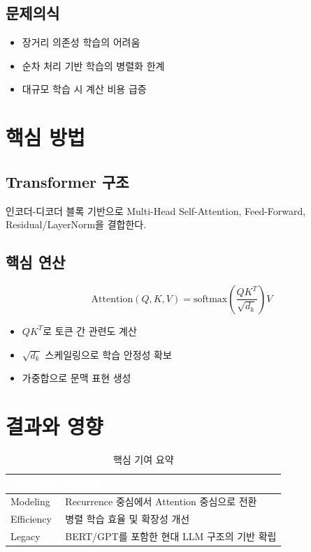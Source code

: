 \documentclass[11pt]{article}
\newenvironment{insightbox}[1]{%
  \begin{tcolorbox}[colback=bgpurple, colframe=accentpurple!60,
    title={\small\bfseries #1},
    fonttitle=\small\bfseries,
    coltitle=accentpurple, colbacktitle=bgpurple,
    left=6pt, right=6pt, top=4pt, bottom=4pt,
    boxrule=0.6pt]
}{\end{tcolorbox}}
\begin{document}
\subsection{문제의식}
\begin{itemize}[leftmargin=1.2em]
  \item 장거리 의존성 학습의 어려움
  \item 순차 처리 기반 학습의 병렬화 한계
  \item 대규모 학습 시 계산 비용 급증
\end{itemize}

\section{핵심 방법}
\subsection{Transformer 구조}
인코더-디코더 블록 기반으로 Multi-Head Self-Attention, Feed-Forward, Residual/LayerNorm을 결합한다.

\subsection{핵심 연산}
\[
\mathrm{Attention}(Q,K,V)=\mathrm{softmax}\left(\frac{QK^T}{\sqrt{d_k}}\right)V
\]

\begin{insightbox}{해석 포인트}
\begin{itemize}[leftmargin=1.2em]
  \item $QK^T$로 토큰 간 관련도 계산
  \item $\sqrt{d_k}$ 스케일링으로 학습 안정성 확보
  \item 가중합으로 문맥 표현 생성
\end{itemize}
\end{insightbox}

\section{결과와 영향}
\begin{table}[H]
\centering\small
\begin{tabularx}{\linewidth}{|l|X|}
\hline
\rowcolor{tabhead}\textcolor{white}{\textbf{Category}} & \textcolor{white}{\textbf{Impact}} \\
\hline
Modeling & Recurrence 중심에서 Attention 중심으로 전환 \\
\hline
Efficiency & 병렬 학습 효율 및 확장성 개선 \\
\hline
Legacy & BERT/GPT를 포함한 현대 LLM 구조의 기반 확립 \\
\hline
\end{tabularx}
\caption{핵심 기여 요약}
\end{table}
\end{document}
